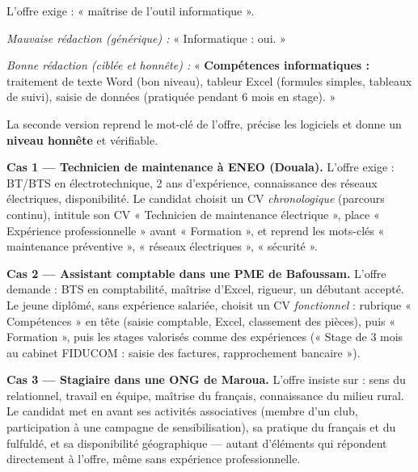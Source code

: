 \documentclass[11pt]{article}
\newcounter{popsec}
\newcounter{popsub}
\newcommand{\courssub}[1]{%
  \stepcounter{popsub}%
  \par\vspace{9pt}\noindent{\popxbold\fontsize{11.5}{13}\selectfont\color{popink}{\color{poporange}\thepopsec.\thepopsub}\hspace{6pt}#1}\par\nopagebreak\vspace{4pt}
}
\begin{document}
\begin{exemplebox}
L'offre exige : « maîtrise de l'outil informatique ».

\emph{Mauvaise rédaction (générique) :} « Informatique : oui. »

\emph{Bonne rédaction (ciblée et honnête) :} « \textbf{Compétences informatiques :} traitement de texte Word (bon niveau), tableur Excel (formules simples, tableaux de suivi), saisie de données (pratiquée pendant 6 mois en stage). »

La seconde version reprend le mot-clé de l'offre, précise les logiciels et donne un \textbf{niveau honnête} et vérifiable.
\end{exemplebox}

\courssub{Cas pratiques camerounais}

\textbf{Cas 1 — Technicien de maintenance à ENEO (Douala).} L'offre exige : BT/BTS en électrotechnique, 2 ans d'expérience, connaissance des réseaux électriques, disponibilité. Le candidat choisit un CV \emph{chronologique} (parcours continu), intitule son CV « Technicien de maintenance électrique », place « Expérience professionnelle » avant « Formation », et reprend les mots-clés « maintenance préventive », « réseaux électriques », « sécurité ».

\textbf{Cas 2 — Assistant comptable dans une PME de Bafoussam.} L'offre demande : BTS en comptabilité, maîtrise d'Excel, rigueur, un débutant accepté. Le jeune diplômé, sans expérience salariée, choisit un CV \emph{fonctionnel} : rubrique « Compétences » en tête (saisie comptable, Excel, classement des pièces), puis « Formation », puis les stages valorisés comme des expériences (« Stage de 3 mois au cabinet FIDUCOM : saisie des factures, rapprochement bancaire »).

\textbf{Cas 3 — Stagiaire dans une ONG de Maroua.} L'offre insiste sur : sens du relationnel, travail en équipe, maîtrise du français, connaissance du milieu rural. Le candidat met en avant ses activités associatives (membre d'un club, participation à une campagne de sensibilisation), sa pratique du français et du fulfuldé, et sa disponibilité géographique — autant d'éléments qui répondent directement à l'offre, même sans expérience professionnelle.
\end{document}
